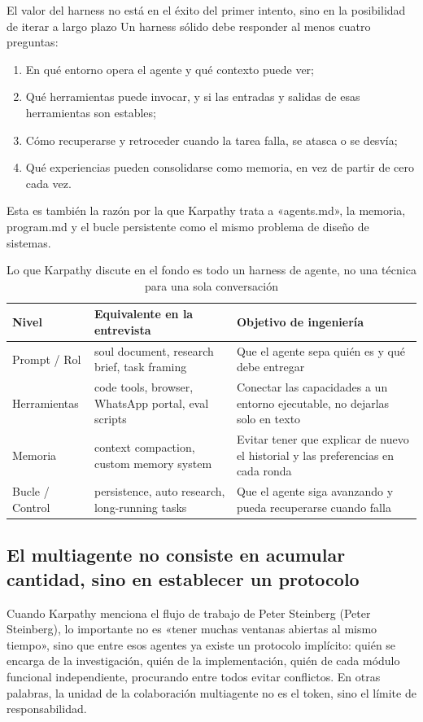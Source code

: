 \documentclass[a4paper]{article}
\begin{document}
\begin{importantbox}{El valor del harness no está en el éxito del primer intento, sino en la posibilidad de iterar a largo plazo}
Un harness sólido debe responder al menos cuatro preguntas:
\begin{enumerate}
    \item En qué entorno opera el agente y qué contexto puede ver;
    \item Qué herramientas puede invocar, y si las entradas y salidas de esas herramientas son estables;
    \item Cómo recuperarse y retroceder cuando la tarea falla, se atasca o se desvía;
    \item Qué experiencias pueden consolidarse como memoria, en vez de partir de cero cada vez.
\end{enumerate}
Esta es también la razón por la que Karpathy trata a «agents.md», la memoria, program.md y el bucle persistente como el mismo problema de diseño de sistemas.
\end{importantbox}

\begin{table}[H]
\centering
\begin{tabular}{p{2.6cm}p{4.1cm}p{5.2cm}}
\toprule
\textbf{Nivel} & \textbf{Equivalente en la entrevista} & \textbf{Objetivo de ingeniería} \\
\midrule
Prompt / Rol & soul document, research brief, task framing & Que el agente sepa quién es y qué debe entregar \\
Herramientas & code tools, browser, WhatsApp portal, eval scripts & Conectar las capacidades a un entorno ejecutable, no dejarlas solo en texto \\
Memoria & context compaction, custom memory system & Evitar tener que explicar de nuevo el historial y las preferencias en cada ronda \\
Bucle / Control & persistence, auto research, long-running tasks & Que el agente siga avanzando y pueda recuperarse cuando falla \\
\bottomrule
\end{tabular}
\caption{Lo que Karpathy discute en el fondo es todo un harness de agente, no una técnica para una sola conversación}
\end{table}

\subsection{El multiagente no consiste en acumular cantidad, sino en establecer un protocolo}
Cuando Karpathy menciona el flujo de trabajo de Peter Steinberg (Peter Steinberg), lo importante no es «tener muchas ventanas abiertas al mismo tiempo», sino que entre esos agentes ya existe un protocolo implícito: quién se encarga de la investigación, quién de la implementación, quién de cada módulo funcional independiente, procurando entre todos evitar conflictos. En otras palabras, la unidad de la colaboración multiagente no es el token, sino el límite de responsabilidad.
\end{document}
